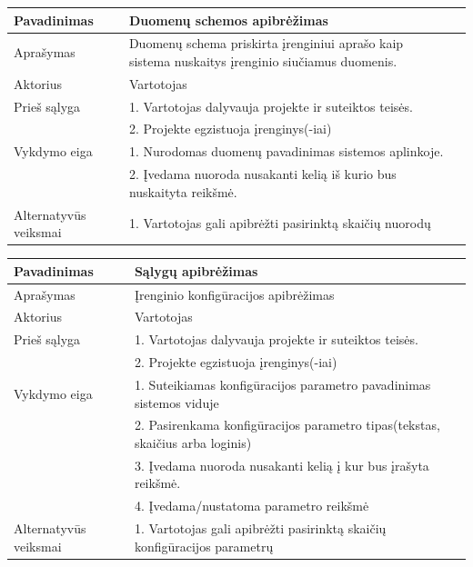 \documentclass{VUMIFInfBakalaurinis}
\begin{document}
\hfill \break

\begin{tabular}{  l  p{10cm}  p{15cm} }

\toprule
\textbf{Pavadinimas}
& \textbf{Duomenų schemos apibrėžimas} \\
\midrule

Aprašymas
& Duomenų schema priskirta įrenginiui aprašo kaip sistema nuskaitys įrenginio siučiamus duomenis. \\

\hline
Aktorius    
& Vartotojas \\

\hline
Prieš sąlyga
& 1. Vartotojas dalyvauja projekte ir suteiktos teisės. \\
& 2. Projekte egzistuoja įrenginys(-iai) \\

\hline
Vykdymo eiga    
& 1. Nurodomas duomenų pavadinimas sistemos aplinkoje. \\
& 2. Įvedama nuoroda nusakanti kelią iš kurio bus nuskaityta reikšmė. \\

\hline
Alternatyvūs veiksmai
& 1. Vartotojas gali apibrėžti pasirinktą skaičių nuorodų \\

\bottomrule
\end{tabular}

\hfill \break

\begin{tabular}{  l  p{10cm}  p{15cm} }

\toprule
\textbf{Pavadinimas}
& \textbf{Sąlygų apibrėžimas} \\
\midrule

Aprašymas
& Įrenginio konfigūracijos apibrėžimas \\

\hline
Aktorius    
& Vartotojas \\

\hline
Prieš sąlyga
& 1. Vartotojas dalyvauja projekte ir suteiktos teisės. \\
& 2. Projekte egzistuoja įrenginys(-iai) \\

\hline
Vykdymo eiga    
& 1. Suteikiamas konfigūracijos parametro pavadinimas sistemos viduje \\
& 2. Pasirenkama konfigūracijos parametro tipas(tekstas, skaičius arba loginis) \\
& 3. Įvedama nuoroda nusakanti kelią į kur bus įrašyta reikšmė.  \\
& 4. Įvedama/nustatoma parametro reikšmė \\

\hline
Alternatyvūs veiksmai
& 1. Vartotojas gali apibrėžti pasirinktą skaičių konfigūracijos parametrų \\

\bottomrule
\end{tabular}
\end{document}
